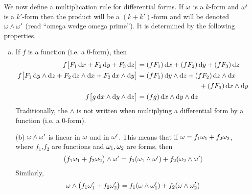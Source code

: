 \begin{defn}
             \label{def:differentialFormMult}
We now define a multiplication rule for differential forms. 
If $\omega$ is a $k$-form and $\omega'$ is a 
$k'$-form then the product will be a $(k+k')$-form and will be denoted
$\omega\wedge\omega'$ (read ``omega wedge omega prime''). It is 
determined by the following properties.
\begin{enumerate}[(a)]
\item
If $f$ is a function (i.e. a $0$-form), then
\begin{align*}
 f\big[F_1\,\mathrm{d}x + F_2\,\mathrm{d}y + F_3\,\mathrm{d}z\big]
   &= (fF_1)\,\mathrm{d}x + (fF_2)\,\mathrm{d}y + (fF_3)\,\mathrm{d}z
\\
 f\big[F_1\,\mathrm{d}y\wedge\mathrm{d}z
       + F_2\,\mathrm{d}z\wedge\mathrm{d}x 
       + F_3\,\mathrm{d}x\wedge\mathrm{d}y\big]
  &=(fF_1)\,\mathrm{d}y\wedge\mathrm{d}z
       + (fF_2)\,\mathrm{d}z\wedge\mathrm{d}x \\&\hskip1.25in
       + (fF_3)\,\mathrm{d}x\wedge\mathrm{d}y
\\
 f\big[g\,\mathrm{d}x\wedge\mathrm{d}y\wedge\mathrm{d}z\big]
   &= (fg)\,\mathrm{d}x\wedge\mathrm{d}y\wedge\mathrm{d}z
\end{align*}
Traditionally, the $\wedge$ is not written when multiplying
a differential form by a function (i.e. a $0$-form).

\item[(b)] %
$\omega\wedge\omega'$ is linear in $\omega$ and in $\omega'$. This means that
if $\omega = f_1\omega_1+f_2\omega_2$, where $f_1$,$f_2$ are 
functions and $\omega_1,\omega_2$ are forms, then
\begin{equation*}
\big(f_1\omega_1+f_2\omega_2\big)\wedge \omega'= f_1 (\omega_1\wedge\omega')
+f_2 (\omega_2\wedge\omega')
\end{equation*}
Similarly, 
\begin{equation*}
\omega\wedge\big(f_1\omega'_1+f_2\omega'_2\big)= f_1 (\omega\wedge\omega'_1)
+f_2 (\omega\wedge\omega'_2)
\end{equation*}




\end{enumerate}
\end{defn}
